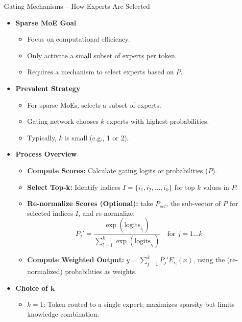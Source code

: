 \begin{frame}[allowframebreaks]{Gating Mechanisms – How Experts Are Selected}
\begin{itemize}
\begin{itemize}
            \item \textbf{Sparse MoE Goal}
            \begin{itemize}
                \item Focus on computational efficiency.
                \item Only activate a small subset of experts per token.
                \item Requires a mechanism to select experts based on $P$.
            \end{itemize}
        \end{itemize}
    \framebreak
        \begin{itemize}
            \item \textbf{Prevalent Strategy}
            \begin{itemize}
                \item For sparse MoEs, selects a subset of experts.
                \item Gating network chooses $k$ experts with highest probabilities.
                \item Typically, $k$ is small (e.g., 1 or 2).
            \end{itemize}
        \framebreak
            \item \textbf{Process Overview}
            \begin{itemize}
                \item \textbf{Compute Scores:} Calculate gating logits or probabilities ($P$).
                \item \textbf{Select Top-k:} Identify indices $I = \{i_1, i_2, \dots, i_k\}$ for top $k$ values in $P$.
                \item \textbf{Re-normalize Scores (Optional):} take $P_{sel}$, the sub-vector of $P$ for selected indices $I$, and re-normalize:
                \[ P_j' = \frac{\exp(\text{logits}_{i_j})}{\sum_{l=1}^k \exp(\text{logits}_{i_l})} \quad \text{for } j=1 \dots k \]
                \item \textbf{Compute Weighted Output:} $y = \sum_{j=1}^k P_j' E_{i_j}(x)$, using the (re-normalized) probabilities as weights.
            \end{itemize}
        \framebreak
            \item \textbf{Choice of $\boldsymbol{k}$}
            \begin{itemize}
                \item $k=1$: Token routed to a single expert; maximizes sparsity but limits knowledge combination.

\end{itemize}
\end{itemize}
\end{itemize}
\end{frame}
